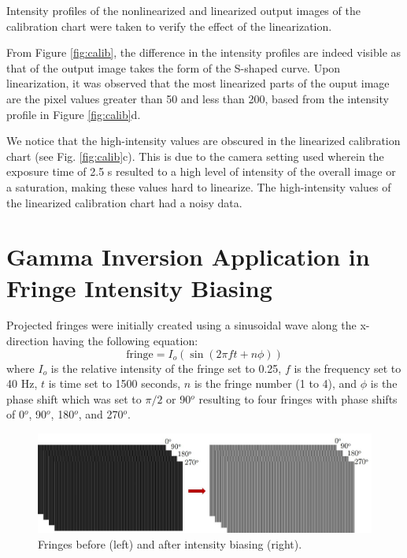 Intensity profiles of the nonlinearized and linearized output images of the calibration chart were taken to verify the effect of the linearization. 

From Figure \ref{fig:calib}, the difference in the intensity profiles are indeed visible as that of the output image takes the form of the S-shaped curve. Upon linearization, it was observed that the most linearized parts of the ouput image are the pixel values greater than 50 and less than 200, based from the intensity profile in Figure \ref{fig:calib}d. 

We notice that the high-intensity values are obscured in the linearized calibration chart (see Fig. \ref{fig:calib}c). This is due to the camera setting used wherein the exposure time of 2.5 s resulted to a high level of intensity of the overall image or a saturation, making these values hard to linearize. The high-intensity values of the linearized calibration chart had a noisy data. 

\section{Gamma Inversion Application in Fringe Intensity Biasing}
Projected fringes were initially created using a sinusoidal wave along the x-direction having the following equation:
\begin{equation}
\textrm{fringe} = I_o(\sin(2\pi f t + n\phi))
\label{sine wave}
\end{equation}
where $I_o$ is the relative intensity of the fringe set to 0.25, $f$ is the frequency set to 40 Hz, $t$ is time set to 1500 seconds, $n$ is the fringe number (1 to 4), and $\phi$ is the phase shift which was set to $\pi/2$ or 90$^o$ resulting to four fringes with phase shifts of 0$^o$, 90$^o$, 180$^o$, and 270$^o$.

\captionsetup[figure]{width=5in}
\begin{figure}[h!]
	\centering
	\includegraphics[width=1\textwidth]{figures/fringes.jpg}
	\caption[Fringes before and after gamma inversion]{Fringes before (left) and after intensity biasing (right).}
	\label{fig:fringes}
\end{figure}

